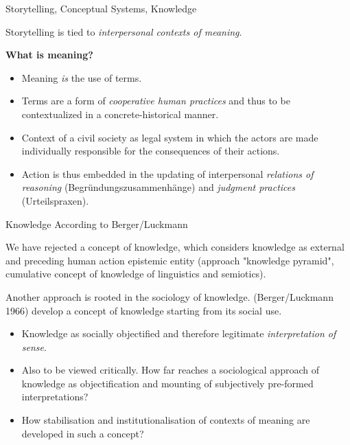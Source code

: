 \documentclass{beamer}
\begin{document}
\begin{frame}{Storytelling, Conceptual Systems, Knowledge}

Storytelling is tied to \emph{interpersonal contexts of meaning}.

\textbf{What is meaning?}
\begin{itemize}
\item Meaning \emph{is} the use of terms.
\item Terms are a form of \emph{cooperative human practices} and thus to be
  contextualized in a concrete-historical manner.
\item Context of a civil society as legal system in which the actors are made
  individually responsible for the consequences of their actions.
\item Action is thus embedded in the updating of interpersonal \emph{relations
  of reasoning} (Begründungszusammenhänge) and \emph{judgment practices}
  (Urteilspraxen).
\end{itemize}
\end{frame}
\begin{frame}{Knowledge According to Berger/Luckmann}

We have rejected a concept of knowledge, which considers knowledge as external
and preceding human action epistemic entity (approach "knowledge pyramid",
cumulative concept of knowledge of linguistics and semiotics).

Another approach is rooted in the sociology of knowledge.  (Berger/Luckmann
1966) develop a concept of knowledge starting from its social use.
\begin{itemize}
\item Knowledge as socially objectified and therefore legitimate
  \emph{interpretation of sense}.
\item Also to be viewed critically. How far reaches a sociological approach of
  knowledge as objectification and mounting of subjectively pre-formed
  interpretations?
\item How stabilisation and institutionalisation of contexts of meaning are
  developed in such a concept?
\end{itemize}
\end{frame}
\end{document}
